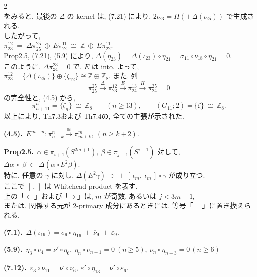 \documentclass[10pt, leqno]{ltjsarticle}
\newcommand{\ov}[1]{\overline{#1}}
\newcommand{\gen}[1]{\{#1\}}       %
\newcommand{\pit}[2]{\pi_{#1}^{#2}}
\numberwithin{equation}{section}
\theoremstyle{plain}
\theoremstyle{definition}
\theoremstyle{remark}
\begin{document}
\begin{paracol}{2}
\[\]
をみると, 最後の \(\Delta\) の kernel は, (7.21) により,
\(
  2\iota_{23}=H(\pm\,\Delta(\iota_{25}))
\)
で生成される. \\
したがって,\\
\(
  \pit{23}{12}
  \;=\;
  \Delta\pit{25}{25}\ \oplus\ E\pit{22}{11}
  \;\cong\; \mathbb Z\ \oplus\ E\pit{22}{11}.
\)\\
Prop2.5, (7.21), (5.9) により, 
\(
\Delta(\eta_{23}) = \Delta(\iota_{23}) \circ \eta_{21}
= \sigma_{11}\circ\nu_{18}\circ\eta_{21} = 0.
\)\\
このように, \(\Delta\pit{24}{23} = 0\) で, 
\(E\) は into. よって, \\
\(
\pit{23}{12} 
= \gen{\Delta(\iota_{25})} \oplus \gen{\zeta_{12}}
\cong \mathbb{Z} \oplus \mathbb{Z}_8.
\)
また, 列 
\[
  \pit{25}{25}\xrightarrow{\ \Delta\ }
  \pit{23}{12}\xrightarrow{\ E\ }
  \pit{24}{13}\xrightarrow{\ H\ }
  \pit{24}{25}=0
\]
の完全性と, (4.5) から, 
\[
  \pit{n+11}{n}=\gen{\zeta_{n}}\ \cong\ \mathbb Z_{8}\qquad(n\ge13),
  \qquad
  (G_{11};2)=\gen{\zeta}\ \cong\ \mathbb Z_{8}.
\]
以上により, Th7.3および Th7.4の, 全ての主張が示された. 

\switchcolumn

\noindent
\textbf{(4.5).}\
\(E^{m-n}:\pit{n+k}{n}\xrightarrow{\cong}\pit{m+k}{m},\
(n\ge k+2). \)

\noindent
\textbf{Prop2.5.}\
$\alpha\in\pi_{i+1}(S^{2m+1}), \ \beta\in \pi_{j-1}(S^{i-1})$ 対して, 
\(
\Delta\alpha\ \circ\ \beta\ \subset\ \Delta(\alpha\circ E^2\beta).
\)\\
特に, 任意の $\gamma$ に対し,
\(
\Delta(E^2\gamma)\ \ni\ \pm\,[\,\iota_m,\ \iota_m\,]\circ\gamma
\)
が成り立つ. \\
ここで $[\, ,\,]$ は Whitehead product を表す. \\
上の「$\subset$」および「$\ni$」は, $m$ が奇数, 
あるいは $j<3m-1$, \\
または, 関係する元が \(2\)-primary 成分にあるときには, 
等号「$=$」に置き換えられる. 

\noindent
\textbf{(7.1).}\
\(\Delta(\iota_{19})=\sigma_{9}\circ\eta_{16}\ +\ \ov{\nu}_{9}\ +\ \varepsilon_{9}.\)

\noindent
\textbf{(5.9).}\
\(\eta_3\circ \nu_4= \nu'\circ \eta_6,\
\eta_n\circ \nu_{n+1}=0\ (n\ge5),\
\nu_n\circ \eta_{n+3}=0\ (n\ge6)\)

\noindent
\textbf{(7.12).}\
\(\varepsilon_3\circ\nu_{11} = \nu'\circ\ov{\nu}_6,\
\varepsilon'\circ\eta_{13} = \nu'\circ\varepsilon_6 .\)






\end{paracol}
\end{document}
